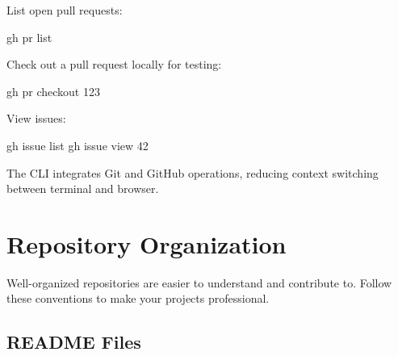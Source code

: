 \documentclass[
  letterpaper,
  DIV=11,
  numbers=noendperiod]{scrreprt}
\newenvironment{Shaded}{\begin{snugshade}}{\end{snugshade}}
\newcommand{\ExtensionTok}[1]{\textcolor[rgb]{0.00,0.23,0.31}{#1}}
\newcommand{\NormalTok}[1]{\textcolor[rgb]{0.00,0.23,0.31}{#1}}
\begin{document}
List open pull requests:

\begin{codelisting}

\caption{\texttt{terminal}}

\begin{Shaded}
\begin{Highlighting}[]
\ExtensionTok{gh}\NormalTok{ pr list}
\end{Highlighting}
\end{Shaded}

\end{codelisting}

Check out a pull request locally for testing:

\begin{codelisting}

\caption{\texttt{terminal}}

\begin{Shaded}
\begin{Highlighting}[]
\ExtensionTok{gh}\NormalTok{ pr checkout 123}
\end{Highlighting}
\end{Shaded}

\end{codelisting}

View issues:

\begin{codelisting}

\caption{\texttt{terminal}}

\begin{Shaded}
\begin{Highlighting}[]
\ExtensionTok{gh}\NormalTok{ issue list}
\ExtensionTok{gh}\NormalTok{ issue view 42}
\end{Highlighting}
\end{Shaded}

\end{codelisting}

The CLI integrates Git and GitHub operations, reducing context switching
between terminal and browser.

\section{Repository Organization}\label{repository-organization}

Well-organized repositories are easier to understand and contribute to.
Follow these conventions to make your projects professional.

\subsection{README Files}\label{readme-files}
\end{document}
